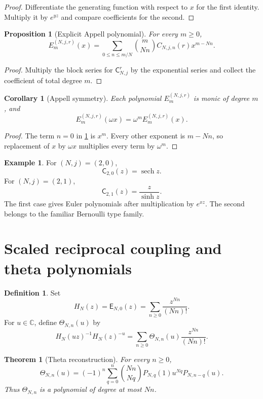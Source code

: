 \documentclass{aomart}
\newtheorem{theorem}{Theorem}[section]
\newtheorem{proposition}[proposition]{Proposition}
\newtheorem{corollary}[corollary]{Corollary}
\theoremstyle{definition}
\newtheorem{definition}[definition]{Definition}
\newtheorem{example}[example]{Example}
\theoremstyle{remark}
\newcommand{\CC}{\mathbb C}
\newcommand{\Efun}{\mathsf E}
\newcommand{\Cfun}{\mathsf C}
\newcommand{\Thetafun}{\mathsf\Theta}
\newcommand{\sech}{\operatorname{sech}}
\begin{document}
\begin{proof}
Differentiate the generating function with respect to $x$ for the first identity.  Multiply it by $e^{yz}$ and compare coefficients for the second.
\end{proof}

\begin{proposition}[Explicit Appell polynomial]\label{prop:explicit_appell}
For every $m\geq0$,
\[
E_m^{(N,j,r)}(x)
=
\sum_{0\leq n\leq m/N}
\binom{m}{Nn}
C_{N,j,n}(r)x^{m-Nn}.
\]
\end{proposition}

\begin{proof}
Multiply the block series for $\Cfun_{N,j}^r$ by the exponential series and collect the coefficient of total degree $m$.
\end{proof}


\begin{corollary}[Appell symmetry]\label{cor:appell_symmetry}
Each polynomial $E_m^{(N,j,r)}$ is monic of degree $m$, and
\[
E_m^{(N,j,r)}(\omega x)
=
\omega^mE_m^{(N,j,r)}(x).
\]
\end{corollary}

\begin{proof}
The term $n=0$ in \cref{prop:explicit_appell} is $x^m$.  Every other exponent is $m-Nn$, so replacement of $x$ by $\omega x$ multiplies every term by $\omega^m$.
\end{proof}

\begin{example}\label{ex:euler_boundaries}
For $(N,j)=(2,0)$,
\[
\Cfun_{2,0}(z)=\sech z.
\]
For $(N,j)=(2,1)$,
\[
\Cfun_{2,1}(z)=\frac z{\sinh z}.
\]
The first case gives Euler polynomials after multiplication by $e^{xz}$.  The second belongs to the familiar Bernoulli type family.
\end{example}

\section{Scaled reciprocal coupling and theta polynomials}\label{sec:theta}

\begin{definition}\label{def:unsigned_denominator}
Set
\[
H_N(z)=\Efun_{N,0}(z)
=
\sum_{n\geq0}\frac{z^{Nn}}{(Nn)!}.
\]
For $u\in\CC$, define $\Thetafun_{N,n}(u)$ by
\[
H_N(uz)^{-1}H_N(z)^{-u}
=
\sum_{n\geq0}\Thetafun_{N,n}(u)\frac{z^{Nn}}{(Nn)!}.
\]
\end{definition}

\begin{theorem}[Theta reconstruction]\label{thm:theta_reconstruction}
For every $n\geq0$,
\[
\Thetafun_{N,n}(u)
=
(-1)^n
\sum_{q=0}^{n}
\binom{Nn}{Nq}
P_{N,q}(1)u^{Nq}P_{N,n-q}(u).
\]
Thus $\Thetafun_{N,n}$ is a polynomial of degree at most $Nn$.
\end{theorem}
\end{document}

